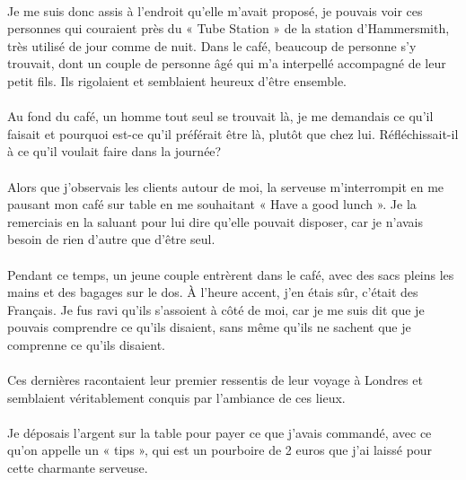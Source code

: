 \paragraph{} Je me suis donc assis à l'endroit qu'elle m'avait proposé, je
pouvais voir ces personnes qui couraient près du « Tube Station » de la station
d'Hammersmith, très utilisé de jour comme de nuit. Dans le café, beaucoup de
personne s'y trouvait, dont un couple de personne âgé qui m'a interpellé
accompagné de leur petit fils. Ils rigolaient et semblaient heureux d'être
ensemble.

\paragraph{} Au fond du café, un homme tout seul se trouvait là, je me
demandais ce qu'il faisait et pourquoi est-ce qu'il préférait être là, plutôt
que chez lui.  Réfléchissait-il à ce qu'il voulait faire dans la journée?

\paragraph{} Alors que j'observais les clients autour de moi, la serveuse
m'interrompit en me pausant mon café sur table en me souhaitant « Have a good
lunch ».  Je la remerciais en la saluant pour lui dire qu'elle pouvait
disposer, car je n'avais besoin de rien d'autre que d'être seul.

\paragraph{} Pendant ce temps, un jeune couple entrèrent dans le café, avec des
sacs pleins les mains et des bagages sur le dos. À l'heure accent, j'en étais
sûr, c'était des Français. Je fus ravi qu'ils s'assoient à côté de moi, car je
me suis dit que je pouvais comprendre ce qu'ils disaient, sans même qu'ils ne
sachent que je comprenne ce qu'ils disaient.

\paragraph{} Ces dernières racontaient leur premier ressentis de leur voyage à
Londres et semblaient véritablement conquis par l'ambiance de ces lieux.

\paragraph{} Je déposais l'argent sur la table pour payer ce que j'avais
commandé, avec ce qu'on appelle un « tips », qui est un pourboire de 2 euros
que j'ai laissé pour cette charmante serveuse.

